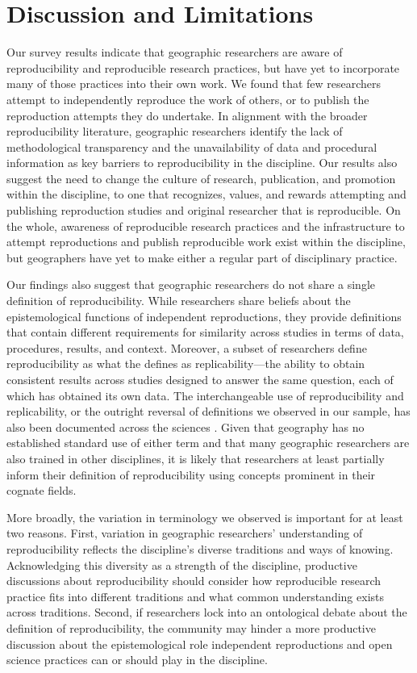\documentclass[]{interact}
\theoremstyle{plain}%
\theoremstyle{definition}
\theoremstyle{remark}
\begin{document}
\section*{Discussion and Limitations}
Our survey results indicate that geographic researchers are aware of reproducibility and reproducible research practices, but have yet to incorporate many of those practices into their own work. 
We found that few researchers attempt to independently reproduce the work of others, or to publish the reproduction attempts they do undertake.
In alignment with the broader reproducibility literature, geographic researchers identify the lack of methodological transparency and the unavailability of data and procedural information as key barriers to reproducibility in the discipline. 
Our results also suggest the need to change the culture of research, publication, and promotion within the discipline, to one that recognizes, values, and rewards attempting and publishing reproduction studies and original researcher that is reproducible.  
On the whole, awareness of reproducible research practices and the infrastructure to attempt reproductions and publish reproducible work exist within the discipline, but geographers have yet to make either a regular part of disciplinary practice. 

Our findings also suggest that geographic researchers do not share a single definition of reproducibility. 
While researchers share beliefs about the epistemological functions of independent reproductions, they provide definitions that contain different requirements for similarity across studies in terms of data, procedures, results, and context.  
Moreover, a subset of researchers define reproducibility as what the \citet{NASEM2019} defines as replicability---the ability to obtain consistent results across studies designed to answer the same question, each of which has obtained its own data.
The interchangeable use of reproducibility and replicability, or the outright reversal of definitions we observed in our sample, has also been documented across the sciences \citep{barba2018terminologies, plesser2018reproducibility}. 
Given that geography has no established standard use of either term and that many geographic researchers are also trained in other disciplines, it is likely that researchers at least partially inform their definition of reproducibility using concepts prominent in their cognate fields.

More broadly, the variation in terminology we observed is important for at least two reasons. 
First, variation in geographic researchers' understanding of reproducibility reflects the discipline's diverse traditions and ways of knowing. 
Acknowledging this diversity as a strength of the discipline, productive discussions about reproducibility should consider how reproducible research practice fits into different traditions and what common understanding exists across traditions. 
Second, if researchers lock into an ontological debate about the definition of reproducibility, the community may hinder a more productive discussion about the epistemological role independent reproductions and open science practices can or should play in the discipline. 
\end{document}
